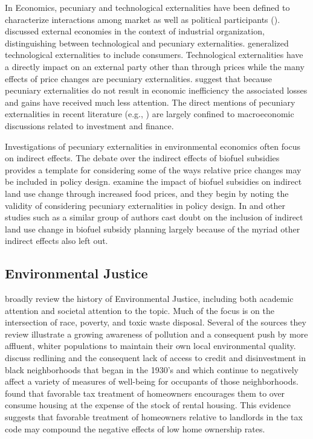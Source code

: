 \documentclass[ecta,nameyear,draft]{econsocart}
\theoremstyle{plain}
\theoremstyle{remark}
\begin{document}
In Economics, pecuniary and technological externalities have been defined to characterize interactions among market as well as political participants (\cite{holcombe01}). \cite{scitovsky54} discussed external economies in the context of industrial organization, distinguishing between technological and pecuniary externalities. \cite{buchananstubblebine} generalized technological externalities to include consumers. Technological externalities have a directly impact on an external party other than through prices while the many effects of price changes are pecuniary externalities. \cite{holcombe01} suggest that because pecuniary externalities do not result in economic inefficiency the associated losses and gains have received much less attention. The direct mentions of pecuniary externalities in recent literature (e.g., \cite{davila18}) are largely confined to macroeconomic discussions related to investment and finance. 

Investigations of pecuniary externalities in environmental economics often focus on indirect effects. The debate over the indirect effects of biofuel subsidies provides a template for considering some of the ways relative price changes may be included in policy design. \cite{zilberman11} examine the impact of biofuel subsidies on indirect land use change through increased food prices, and they begin by noting the validity of considering pecuniary externalities in policy design. In \cite{zilberman11} and other studies such as \cite{zilberman13} a similar group of authors cast doubt on the inclusion of indirect land use change in biofuel subsidy planning largely because of the myriad other indirect effects also left out.



\subsection{Environmental Justice} 
\cite{mohai09} broadly review the history of Environmental Justice, including both academic attention and societal attention to the topic. Much of the focus is on the intersection of race, poverty, and toxic waste disposal. Several of the sources they review illustrate a growing awareness of pollution and a consequent push by more affluent, whiter populations to maintain their own local environmental quality.  \cite{aaronson2021} discuss redlining and the consequent lack of access to credit and disinvestment in black neighborhoods that began in the 1930's and which continue to negatively affect a variety of measures of well-being for occupants of those neighborhoods. \cite{gervais2002} found that favorable tax treatment of homeowners encourages them to over consume housing at the expense of the stock of rental housing. This evidence suggests that favorable treatment of homeowners relative to landlords in the tax code may compound the negative effects of low home ownership rates.
\end{document}
